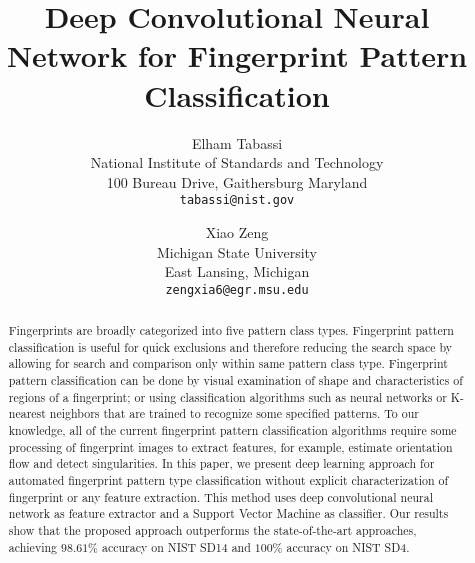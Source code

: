\documentclass[10pt,twocolumn,letterpaper]{article}
\begin{document}
\title{Deep Convolutional Neural Network for Fingerprint Pattern Classification}

\author{Elham Tabassi\\
National Institute of Standards and Technology\\
100 Bureau Drive, Gaithersburg Maryland\\
{\tt\small tabassi@nist.gov}
\and
Xiao Zeng\\
Michigan State University\\
East Lansing, Michigan\\
{\tt\small zengxia6@egr.msu.edu}
}

\maketitle
\thispagestyle{empty}

\begin{abstract}
   Fingerprints are broadly categorized into five pattern class types.
   Fingerprint pattern classification is useful for quick exclusions and 
   therefore reducing the search space by allowing for search and 
   comparison only within same pattern class type.
   Fingerprint pattern classification can be done by visual examination of
   shape and characteristics of regions of a fingerprint; or using classification 
   algorithms such as neural networks or K-nearest neighbors that are trained 
   to recognize some specified patterns.  To our knowledge, all of the current 
   fingerprint pattern classification algorithms require some processing of 
   fingerprint images to extract features, for example, estimate orientation flow 
   and detect singularities.   In this paper, we present deep learning approach 
   for automated fingerprint pattern type classification without explicit characterization  
   of fingerprint or any feature extraction. 
   This method uses deep convolutional neural network as feature extractor and 
   a Support Vector Machine as classifier.  Our results show that the proposed 
   approach outperforms the state-of-the-art approaches, achieving $98.61\%$ accuracy 
   on NIST SD14 and $100\%$ accuracy on NIST SD4.
\end{abstract}
\end{document}
